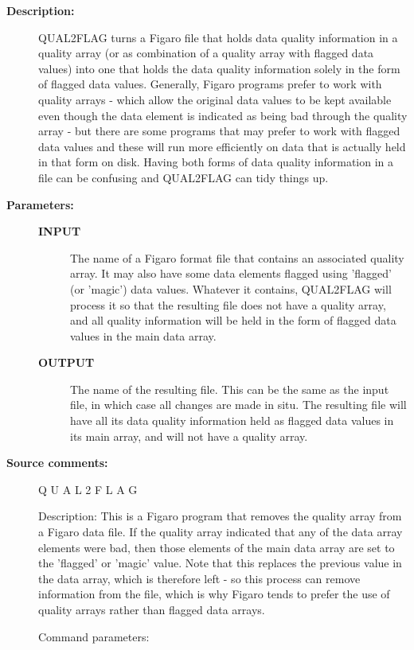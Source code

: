 \begin{description}
\begin{description}
\item [\textbf{Description:}]
 QUAL2FLAG turns a Figaro file that holds data quality information in
 a quality array (or as combination of a quality array with flagged
 data values) into one that holds the data quality information solely
 in the form of flagged data values. Generally, Figaro programs
 prefer to work with quality arrays - which allow the original data
 values to be kept available even though the data element is
 indicated as being bad through the quality array - but there are
 some programs that may prefer to work with flagged data values and
 these will run more efficiently on data that is actually held in
 that form on disk. Having both forms of data quality information
 in a file can be confusing and QUAL2FLAG can tidy things up.

\item [\textbf{Parameters:}]
\begin{description}
\item [\textbf{INPUT}]
 The name of a Figaro format file that
 contains an associated quality array. It may also have
 some data elements flagged using 'flagged' (or 'magic')
 data values. Whatever it contains, QUAL2FLAG will process it
 so that the resulting file does not have a quality array,
 and all quality information will be held in the form of
 flagged data values in the main data array.
\item [\textbf{OUTPUT}]
 The name of the resulting file. This can
 be the same as the input file, in which case all changes are
 made in situ. The resulting file will have all its data
 quality information held as flagged data values in its
 main array, and will not have a quality array.
\end{description}

\item [\textbf{Source comments:}]
\begin{terminalv}
 Q U A L 2 F L A G

 Description:
    This is a Figaro program that removes the quality array from a
    Figaro data file. If the quality array indicated that any of
    the data array elements were bad, then those elements of the
    main data array are set to the 'flagged' or 'magic' value. Note
    that this replaces the previous value in the data array, which is
    therefore left - so this process can remove information from the
    file, which is why Figaro tends to prefer the use of quality
    arrays rather than flagged data arrays.

 Command parameters:


\end{terminalv}
\end{description}
\end{description}
